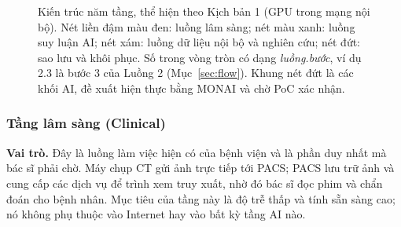 \begin{figure}
\centering
\resizebox{\linewidth}{!}{}
\caption{Kiến trúc năm tầng, thể hiện theo Kịch bản 1 (GPU trong mạng nội bộ). Nét
liền đậm màu đen: luồng lâm sàng; nét màu xanh: luồng suy luận AI; nét xám: luồng
dữ liệu nội bộ và nghiên cứu; nét đứt: sao lưu và khôi phục. Số trong vòng tròn có
dạng \emph{luồng.bước}, ví dụ 2.3 là bước 3 của Luồng 2 (Mục~\ref{sec:flow}).
Khung nét đứt là các khối AI, đề xuất hiện thực bằng MONAI và chờ PoC xác nhận.}
\label{fig:arch-s1}
\end{figure}

\subsubsection{Tầng lâm sàng (Clinical)}

\textbf{Vai trò.} Đây là luồng làm việc hiện có của bệnh viện và là phần duy nhất mà
bác sĩ phải chờ. Máy chụp CT gửi ảnh trực tiếp tới PACS; PACS lưu trữ ảnh và cung cấp
các dịch vụ để trình xem truy xuất, nhờ đó bác sĩ đọc phim và chẩn đoán cho bệnh nhân.
Mục tiêu của tầng này là độ trễ thấp và tính sẵn sàng cao; nó không phụ thuộc vào
Internet hay vào bất kỳ tầng AI nào.


